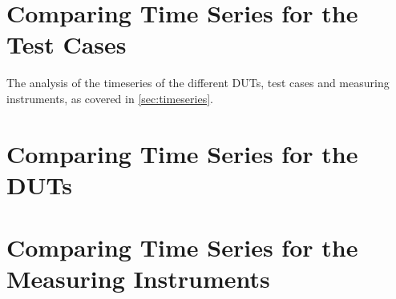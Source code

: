 
\section{Comparing Time Series for the Test Cases}
The analysis of the timeseries of the different DUTs, test cases and measuring instruments, as covered in \cref{sec:timeseries}.



\section{Comparing Time Series for the DUTs}



\section{Comparing Time Series for the Measuring Instruments}



